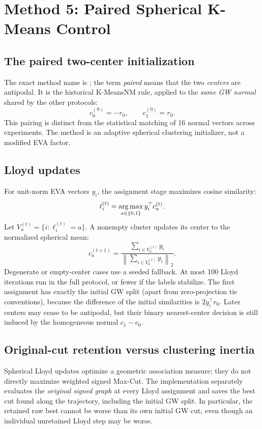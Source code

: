 \section{Method 5: Paired Spherical K-Means Control}\label{sec:paired}
\subsection{The paired two-center initialization}
The exact method name is ; the term \emph{paired} means that the two \emph{centers} are antipodal. It is the historical K-MeansNM rule, applied to the \emph{same GW normal} shared by the other protocols:
\begin{equation}\label{eq:pairedinit}
c_0^{(0)}=-r_0,\qquad c_1^{(0)}=r_0.
\end{equation}
This pairing is distinct from the statistical matching of 16 normal vectors across experiments. The method is an adaptive spherical clustering initializer, not a modified EVA factor.

\subsection{Lloyd updates}
For unit-norm EVA vectors $y_i$, the assignment stage maximizes cosine similarity:
\begin{equation}\label{eq:lloydassignment}
\ell_i^{(t)}=\operatorname*{arg\,max}_{a\in\{0,1\}}y_i^\top c_a^{(t)}.
\end{equation}
Let $V_a^{(t)}=\{i:\ell_i^{(t)}=a\}$. A nonempty cluster updates its center to the normalized spherical mean:
\begin{equation}\label{eq:lloydcenters}
c_a^{(t+1)}
=\frac{\sum_{i\in V_a^{(t)}}y_i}
{\left\|\sum_{i\in V_a^{(t)}}y_i\right\|_2}.
\end{equation}
Degenerate or empty-center cases use a seeded fallback. At most 100 Lloyd iterations run in the full protocol, or fewer if the labels stabilize. The first assignment has exactly the initial GW split (apart from zero-projection tie conventions), because the difference of the initial similarities is $2y_i^\top r_0$. Later centers may cease to be antipodal, but their binary nearest-center decision is still induced by the homogeneous normal $c_1-c_0$.

\subsection{Original-cut retention versus clustering inertia}
Spherical Lloyd updates optimize a geometric association measure; they do not directly maximize weighted signed Max-Cut. The implementation separately evaluates the \emph{original signed graph} at every Lloyd assignment and saves the best cut found along the trajectory, including the initial GW split. In particular, the retained raw best cannot be worse than its own initial GW cut, even though an individual unretained Lloyd step may be worse.

